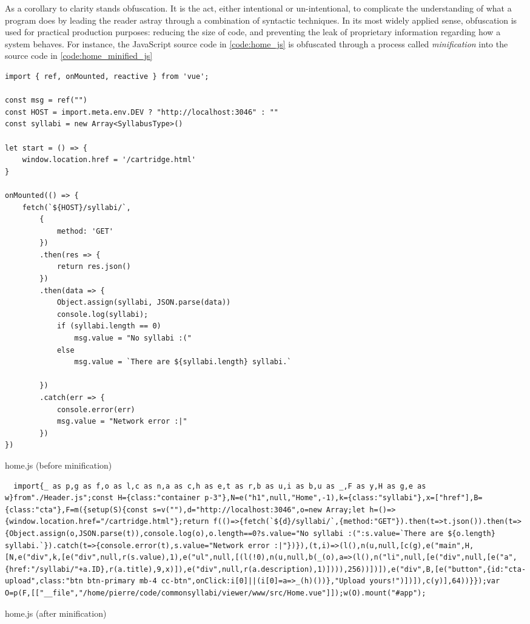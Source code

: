As a corollary to clarity stands obfuscation. It is the act, either intentional or un-intentional, to complicate the understanding of what a program does by leading the reader astray through a combination of syntactic techniques. In its most widely applied sense, obfuscation is used for practical production purposes: reducing the size of code, and preventing the leak of proprietary information regarding how a system behaves. For instance, the JavaScript source code in \ref{code:home_js} is obfuscated through a process called \emph{minification} into the source code in \ref{code:home_minified_js}

\begin{listing}
  \begin{verbatim}
import { ref, onMounted, reactive } from 'vue';

const msg = ref("")
const HOST = import.meta.env.DEV ? "http://localhost:3046" : ""
const syllabi = new Array<SyllabusType>()

let start = () => {
    window.location.href = '/cartridge.html'
}

onMounted(() => {
    fetch(`${HOST}/syllabi/`,
        {
            method: 'GET'
        })
        .then(res => {
            return res.json()
        })
        .then(data => {
            Object.assign(syllabi, JSON.parse(data))
            console.log(syllabi);
            if (syllabi.length == 0)
                msg.value = "No syllabi :("
            else
                msg.value = `There are ${syllabi.length} syllabi.`

        })
        .catch(err => {
            console.error(err)
            msg.value = "Network error :|"
        })
})
\end{verbatim}
  \caption{home.js (before minification)}
  \label{code:home_js}
\end{listing}

\begin{listing}
  \begin{verbatim}
  import{_ as p,g as f,o as l,c as n,a as c,h as e,t as r,b as u,i as b,u as _,F as y,H as g,e as w}from"./Header.js";const H={class:"container p-3"},N=e("h1",null,"Home",-1),k={class:"syllabi"},x=["href"],B={class:"cta"},F=m({setup(S){const s=v(""),d="http://localhost:3046",o=new Array;let h=()=>{window.location.href="/cartridge.html"};return f(()=>{fetch(`${d}/syllabi/`,{method:"GET"}).then(t=>t.json()).then(t=>{Object.assign(o,JSON.parse(t)),console.log(o),o.length==0?s.value="No syllabi :(":s.value=`There are ${o.length} syllabi.`}).catch(t=>{console.error(t),s.value="Network error :|"})}),(t,i)=>(l(),n(u,null,[c(g),e("main",H,[N,e("div",k,[e("div",null,r(s.value),1),e("ul",null,[(l(!0),n(u,null,b(_(o),a=>(l(),n("li",null,[e("div",null,[e("a",{href:"/syllabi/"+a.ID},r(a.title),9,x)]),e("div",null,r(a.description),1)]))),256))])]),e("div",B,[e("button",{id:"cta-upload",class:"btn btn-primary mb-4 cc-btn",onClick:i[0]||(i[0]=a=>_(h)())},"Upload yours!")])]),c(y)],64))}});var O=p(F,[["__file","/home/pierre/code/commonsyllabi/viewer/www/src/Home.vue"]]);w(O).mount("#app");
\end{verbatim}
  \caption{home.js (after minification)}
  \label{code:home_minified_js}
\end{listing}

